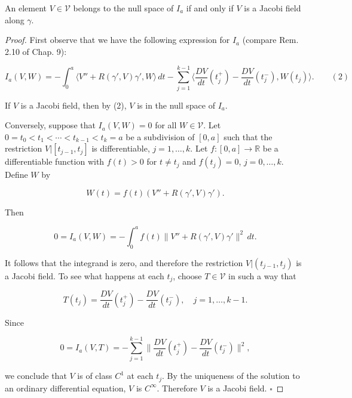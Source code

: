 \begin{proposition}[null space = Jacobi fields]
  \label{prop:dc-ch11-2-3}
  An element $V\in\mathcal{V}$ belongs to the null space of $I_a$ if and only if
  $V$ is a Jacobi field along $\gamma$.
\end{proposition}
\begin{proof}
  First observe that we have the following expression for $I_a$ (compare
  Rem. 2.10 of Chap. 9):
  
  $$
  I_a(V,W)=-\int_0^a\langle V''+R(\gamma',V)\gamma',W\rangle\,dt-\sum_{j=1}^{k-1}\Big\langle\frac{DV}{dt}(t_j^+)-\frac{DV}{dt}(t_j^-),W(t_j)\Big\rangle.\qquad(2)
  $$
  
  If $V$ is a Jacobi field, then by (2), $V$ is in the null space of $I_a$.
  
  Conversely, suppose that $I_a(V,W)=0$ for all $W\in\mathcal{V}$. Let
  $0=t_0<t_1<\cdots<t_{k-1}<t_k=a$ be a subdivision of $[0,a]$ such that the
  restriction $V|[t_{j-1},t_j]$ is differentiable, $j=1,\dots,k$. Let
  $f:[0,a]\to\mathbb{R}$ be a differentiable function with $f(t)>0$ for $t\neq t_j$
  and $f(t_j)=0$, $j=0,\dots,k$. Define $W$ by
  
  $$
  W(t)=f(t)(V''+R(\gamma',V)\gamma').
  $$
  
  Then
  
  $$
  0=I_a(V,W)=-\int_0^a f(t)\|V''+R(\gamma',V)\gamma'\|^2\,dt.
  $$
  
  It follows that the integrand is zero, and therefore the restriction
  $V|(t_{j-1},t_j)$ is a Jacobi field. To see what happens at each $t_j$, choose
  $T\in\mathcal{V}$ in such a way that
  
  $$
  T(t_j)=\frac{DV}{dt}(t_j^+)-\frac{DV}{dt}(t_j^-),\quad j=1,\dots,k-1.
  $$
  
  Since
  
  $$
  0=I_a(V,T)=-\sum_{j=1}^{k-1}\Big\|\frac{DV}{dt}(t_j^+)-\frac{DV}{dt}(t_j^-)\Big\|^2,
  $$
  
  we conclude that $V$ is of class $C^1$ at each $t_j$. By the uniqueness of the
  solution to an ordinary differential equation, $V$ is $C^\infty$. Therefore $V$
  is a Jacobi field. $\square$
\end{proof}

